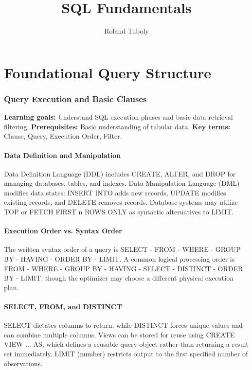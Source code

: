 \documentclass[12pt, a4paper]{article}
\title{SQL Fundamentals}
\author{Roland Tuboly}
\begin{document}
\maketitle
\tableofcontents
\newpage

\part{Foundational Query Structure}

\section{Query Execution and Basic Clauses}
\textbf{Learning goals:} Understand SQL execution phases and basic data retrieval filtering.
\textbf{Prerequisites:} Basic understanding of tabular data.
\textbf{Key terms:} Clause, Query, Execution Order, Filter.

\subsection{Data Definition and Manipulation}
Data Definition Language (DDL) includes CREATE, ALTER, and DROP for managing databases, tables, and indexes.
Data Manipulation Language (DML) modifies data states: INSERT INTO adds new records, UPDATE modifies existing records, and DELETE removes records.
Database systems may utilize TOP or FETCH FIRST n ROWS ONLY as syntactic alternatives to LIMIT.

\subsection{Execution Order vs. Syntax Order}
The written syntax order of a query is SELECT - FROM - WHERE - GROUP BY - HAVING - ORDER BY - LIMIT. A common logical processing order is FROM - WHERE - GROUP BY - HAVING - SELECT - DISTINCT - ORDER BY - LIMIT, though the optimizer may choose a different physical execution plan.

\subsection{SELECT, FROM, and DISTINCT}
SELECT dictates columns to return, while DISTINCT forces unique values and can combine multiple columns. Views can be stored for reuse using CREATE VIEW ... AS, which defines a reusable query object rather than returning a result set immediately. LIMIT (number) restricts output to the first specified number of observations.
\end{document}

